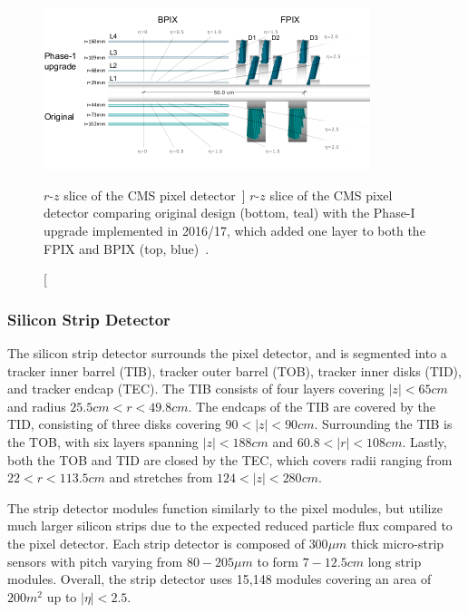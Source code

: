 \begin{figure}[htbp]
	\centering
	\includegraphics[width=0.85\textwidth]{figs/03_experiment/20120828_01_pixel_phase1_largesharp.png}
	\caption
	[$r$-$z$ slice of the CMS pixel detector~\cite{CMSPixelP1}]
	{$r$-$z$ slice of the CMS pixel detector comparing original design (bottom, teal) with the Phase-I upgrade implemented in 2016/17, which added one layer to both the FPIX and BPIX (top, blue)~\cite{CMSPixelP1}.}
	\label{fig:pixel}
\end{figure}

\subsubsection{Silicon Strip Detector} \label{sec:CMS_strip}
The silicon strip detector surrounds the pixel detector, and is segmented into a tracker inner barrel (TIB), tracker outer barrel (TOB), tracker inner disks (TID), and tracker endcap (TEC). The TIB consists of four layers covering $\left|z\right|<65\unit{cm}$ and radius $25.5\unit{cm}<r<49.8\unit{cm}$. The endcaps of the TIB are covered by the TID, consisting of three disks covering $90<\left|z\right|<90\unit{cm}$. Surrounding the TIB is the TOB, with six layers spanning $\left|z\right|<188\unit{cm}$ and $60.8<\left|r\right|<108\unit{cm}$. Lastly, both the TOB and TID are closed by the TEC, which covers radii ranging from $22<r<113.5\unit{cm}$ and stretches from $124<\left|z\right|<280\unit{cm}$.

The strip detector modules function similarly to the pixel modules, but utilize much larger silicon strips due to the expected reduced particle flux compared to the pixel detector. Each strip detector is composed of $300\unit{\mu m}$ thick micro-strip sensors with pitch varying from $80-205\unit{\mu m}$ to form $7-12.5\unit{cm}$ long strip modules. Overall, the strip detector uses 15,148 modules covering an area of $200\unit{m^2}$ up to $\left|\eta\right|<2.5$.

